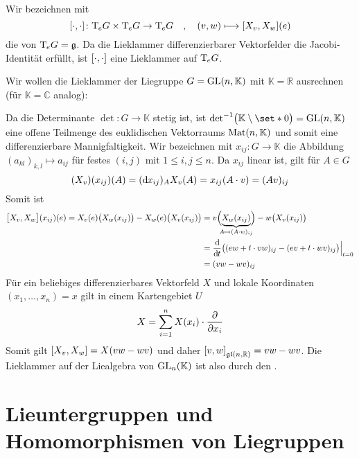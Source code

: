 \begin{definition}[{name=[Liealgebra einer Liegruppe]}]
	Wir bezeichnen mit
	\[
		\benbrace*{\cdot ,\cdot } \colon \Tmap_e G \times \Tmap_e G \to \Tmap_e G \quad ,\quad  (v,w) \longmapsto \benbrace*{X_v,X_w}(e)
	\] 
	die  von $\Tmap_e G = \mathfrak{g}$.
	Da die Lieklammer differenzierbarer Vektorfelder die Jacobi-Identität erfüllt, ist $\benbrace*{\cdot ,\cdot }$ eine Lieklammer auf $\Tmap_e G$.
\end{definition}

\begin{beispiel*}[{name=[{Lieklammer für allgemeine lineare Gruppe}]}]
	Wir wollen die Lieklammer der Liegruppe $G=\GL(n,\mathbb{K})$ mit $\mathbb{K}=\mathbb{R}$ ausrechnen (für $\mathbb{K}=\mathbb{C}$ analog):
	
	Da die Determinante $\det \colon G \to \mathbb{K}$ stetig ist, ist 
	\(
		{\det}^{-1} \enbrace[\big]{\mathbb{K}\setminus \set*{0}} = \GL(n,\mathbb{K}) 
	\)
	eine offene Teilmenge des euklidischen Vektorraums $\Mat(n,\mathbb{K})$ und somit eine differenzierbare Mannigfaltigkeit.
	Wir bezeichnen mit $x_{ij} \colon G \to \mathbb{K}$ die Abbildung $(a_{kl})_{k,l} \mapsto a_{ij}$ für festes $(i,j)$ mit $1\le i,j\le n$.
	Da $x_{ij}$ linear ist, gilt für $A \in G$
	\[
		(X_v)(x_{ij})(A) = (\mathd x_{ij})_A X_v(A) = x_{ij}(A \cdot v) = (A v)_{ij}
	\]
	Somit ist
	\begin{align}
		\benbrace[\big]{X_v,X_w}(x_{ij})(e) = X_v(e) \enbrace[\big]{X_w(x_{ij})} - X_w(e) \enbrace[\big]{X_v(x_{ij})} &= v \enbrace[\Big]{\Underbrace{X_w(x_{ij})}{\mathclap{A \mapsto (A \cdot w)_{ij}}}} - w \enbrace[\big]{X_v(x_{ij})} \\
		&= \diffd{}{t} \enbrace[\big]{(ew + t \cdot vw)_{ij} - (ev + t \cdot wv)_{ij}} \Big|_{t=0} \\
		&= (v w- w v)_{ij}
	\end{align}
	Für ein beliebiges differenzierbares Vektorfeld $X$ und lokale Koordinaten $(x_1, \ldots ,x_n)=x$ gilt in einem Kartengebiet $U$
	\[
		X = \sum_{i=1}^{n} X(x_i) \cdot \diff{}{x_i}
	\]
	Somit gilt $\benbrace*{X_v,X_w} =X(vw -wv)$ und daher $\benbrace*{v,w}_{\mathfrak{gl}(n,\mathbb{R})}=vw -wv$.
	Die Lieklammer auf der Liealgebra von $\GL_n(\mathbb{K})$ ist also durch den .
\end{beispiel*}

\section{Lieuntergruppen und Homomorphismen von Liegruppen} %
\label{sec:12}

